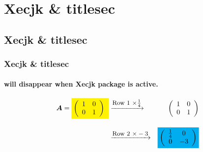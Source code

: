 \documentclass[12pt,a4paper]{article}
\def\vb#1{{{\bm{#1}}}}
\begin{document}
\section{Xecjk \& titlesec}
\subsection{Xecjk \& titlesec}
\subsubsection{Xecjk \& titlesec}

\medskip
\medskip
\paragraph{\Large will disappear when Xecjk package is active.}

\begin{eqnarray*}
\vb{A}=  \colorbox{yellow}{$\displaystyle \left(
\begin{array}{cc}
1 &0\\
0 &1\\
\end{array}
\right)$ }&\xrightarrow[\text{\mbox{}}]{\text{\small Row 1 $\times \tfrac14$}}&
\left(
\begin{array}{cc}
1 &0\\
0 &1\\
\end{array}
\right)
\\[2ex]
&\xrightarrow[\text{\mbox{}}]{\text{\small Row 2 $\times -3$}}&
\colorbox{cyan}{$\displaystyle \left(\begin{array}{cc}
\frac14 &0\\
0 &-3\\
\end{array}
\right)$}
\end{eqnarray*}
\end{document}
